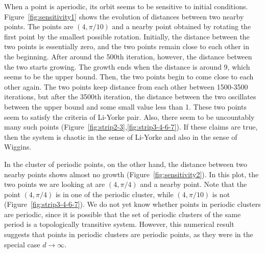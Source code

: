 \documentclass[12pt,twoside]{book}
\begin{document}
When a point is aperiodic, its orbit seems to be sensitive to initial conditions.
Figure~\ref{fig:sensitivity1} shows the evolution of distances between two nearby points.
The points are $(4,\pi/10)$ and a nearby point obtained by rotating the first point by the smallest possible rotation.
Initially, the distance between the two points is essentially zero, and the two points remain close to each other in the beginning.
After around the 500th iteration, however, the distance between the two starts growing.
The growth ends when the distance is around 9, which seems to be the upper bound.
Then, the two points begin to come close to each other again.
The two points keep distance from each other between 1500-3500 iterations, but after the 3500th iteration, the distance between the two oscillates between the upper bound and some small value less than 1.
These two points seem to satisfy the criteria of Li-Yorke pair.
Also, there seem to be uncountably many such points (Figure~\ref{fig:strip2-3},\ref{fig:strip3-4-6-7}).
If these claims are true, then the system is chaotic in the sense of Li-Yorke and also in the sense of Wiggins.

In the cluster of periodic points, on the other hand, the distance between two nearby points shows almost no growth (Figure~\ref{fig:sensitivity2}).
In this plot, the two points we are looking at are $(4,\pi/4)$ and a nearby point.
Note that the point $(4,\pi/4)$ is in one of the periodic cluster, while $(4,\pi/10)$ is not (Figure~\ref{fig:strip3-4-6-7}).
We do not yet know whether points in periodic clusters are periodic, since it is possible that the set of periodic clusters of the same period is a topologically transitive system.
However, this numerical result suggests that points in periodic clusters are periodic points, as they were in the special case $d \to \infty$.
\end{document}
